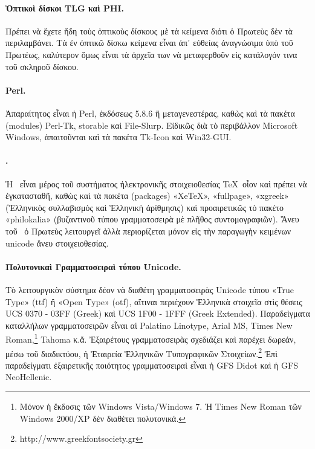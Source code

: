 \documentclass[12pt,a4paper]{article}
\begin{document}
  \paragraph{Ὀπτικοὶ δίσκοι TLG καὶ PHI.}
    Πρέπει νὰ ἔχετε ἤδη τοὺς ὀπτικοὺς δίσκους μὲ τὰ κείμενα
    διότι ὁ Πρωτεὺς δὲν τὰ περιλαμβάνει.
    Τὰ ἐν ὀπτικῶ δίσκω κείμενα εἶναι ἀπ᾽ εὐθείας ἀναγνώσιμα ὑπὸ
    τοῦ Πρωτέως, καλύτερον ὅμως εἶναι τὰ ἀρχεῖα των νὰ μεταφερθοῦν εἰς
    κατάλογόν τινα τοῦ σκληροῦ δίσκου.
  \paragraph{Perl.}
    Ἀπαραίτητος εἶναι ἡ Perl, ἐκδόσεως 5.8.6 ἢ μεταγενεστέρας,
    καθὼς καὶ τὰ πακέτα (modules) Perl-Tk, storable καὶ File-Slurp.
    Εἰδικῶς διὰ τὸ περιβάλλον Microsoft Windows, ἀπαιτοῦνται καὶ τὰ
    πακέτα Tk-Icon καὶ Win32-GUI.
  \paragraph{\XeTeX.}
    Ἡ \XeTeX\ εἶναι μέρος τοῦ συστήματος ἠλεκτρονικῆς στοιχειοθεσίας
    \TeX\ οἷον καὶ πρέπει νὰ ἐγκατασταθῆ, καθὼς καὶ τὰ πακέτα
    (packages) «XeTeX», «fullpage», «xgreek» (Ἑλληνικὸς συλλαβισμὸς
    καὶ Ἑλληνικὴ ἀρίθμησις) καὶ προαιρετικῶς τὸ πακέτο
    «philokalia» (βυζαντινοῦ τύπου γραμματοσειρὰ μὲ πλῆθος
    συντομογραφιῶν). Ἄνευ τοῦ \XeTeX\ ὁ Πρωτεὺς λειτουργεῖ
    ἀλλὰ περιορίζεται μόνον εἰς τὴν παραγωγὴν κειμένων unicode ἄνευ
    στοιχειοθεσίας.
  \paragraph{Πολυτονικαὶ Γραμματοσειραὶ τύπου Unicode.}
    Τὸ λειτουργικὸν σύστημα δέον νὰ διαθέτη γραμματοσειρὰς Unicode
    τύπου «True Type» (ttf) ἢ «Open Type» (otf), αἵτιναι περιέχουν
    Ἑλληνικὰ στοιχεῖα στὶς θέσεις UCS 0370 - 03FF (Greek)
    καὶ UCS 1F00 - 1FFF (Greek Extended).
    Παραδεὶγματα καταλλήλων γραμματοσειρῶν εἶναι αἱ Palatino Linotype,
    Arial MS,
    Times New Roman,\footnote{Μόνον ἡ ἔκδοσις τῶν Windows
                              Vista/Windows 7. Ἡ Times New
                              Roman τῶν Windows 2000/XP δὲν
                              διαθέτει πολυτονικά.}
    Tahoma κ.ἄ. Ἐξαιρέτους γραμματοσειρὰς σχεδιάζει καὶ παρέχει
    δωρεάν, μέσω τοῦ διαδικτύου, ἡ Ἑταιρεία Ἑλληνικῶν Τυπογραφικῶν
    Στοιχείων.\footnote{http://www.greekfontsociety.gr}
    Ἐπὶ παραδείγματι ἐξαιρετικῆς ποιότητος γραμματοσειραὶ εἶναι
    ἡ GFS Didot καὶ ἡ GFS NeoHellenic.
%
\end{document}
